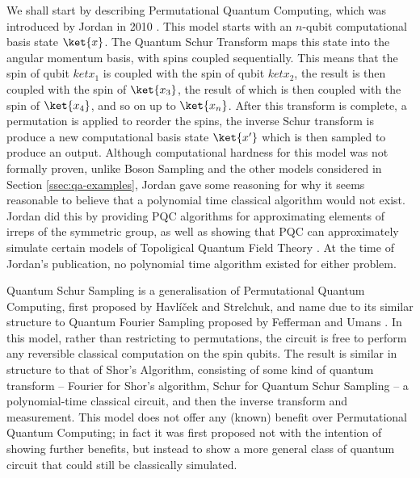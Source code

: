 We shall start by describing Permutational Quantum Computing, which was introduced by Jordan in 2010 \cite{jordan2010}. This model starts with an $n$-qubit computational basis state $\ket{x}$. The Quantum Schur Transform maps this state into the angular momentum basis, with spins coupled sequentially. This means that the spin of qubit $ket{x_1}$ is coupled with the spin of qubit $ket{x_2}$, the result is then coupled with the spin of $\ket{x_3}$, the result of which is then coupled with the spin of $\ket{x_4}$, and so on up to $\ket{x_n}$. After this transform is complete, a permutation is applied to reorder the spins, the inverse Schur transform is produce a new computational basis state $\ket{x'}$ which is then sampled to produce an output. Although computational hardness for this model was not formally proven, unlike Boson Sampling and the other models considered in Section \ref{ssec:qa-examples}, Jordan gave some reasoning for why it seems reasonable to believe that a polynomial time classical algorithm would not exist. Jordan did this by providing PQC algorithms for approximating elements of irreps of the symmetric group, as well as showing that PQC can approximately simulate certain models of Topoligical Quantum Field Theory \cite{jordan2010}. At the time of Jordan's publication, no polynomial time algorithm existed for either problem.

Quantum Schur Sampling is a generalisation of Permutational Quantum Computing, first proposed by Havl\'{i}\v{c}ek and Strelchuk, and name due to its similar structure to Quantum Fourier Sampling proposed by Fefferman and Umans \cite{fefferman2016}. In this model, rather than restricting to permutations, the circuit is free to perform any reversible classical computation on the spin qubits. The result is similar in structure to that of Shor's Algorithm, consisting of some kind of quantum transform -- Fourier for Shor's algorithm, Schur for Quantum Schur Sampling -- a polynomial-time classical circuit, and then the inverse transform and measurement. This model does not offer any (known) benefit over Permutational Quantum Computing; in fact it was first proposed not with the intention of showing further benefits, but instead to show a more general class of quantum circuit that could still be classically simulated.

